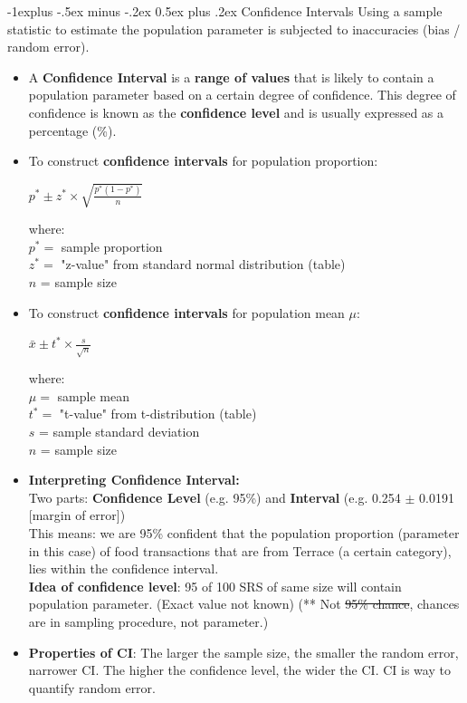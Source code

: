 \documentclass[10pt, landscape]{article}
\makeatletter
\renewcommand{\subsection}{\@startsection{subsection}{2}{0mm}%
                                {-1explus -.5ex minus -.2ex}%
                                {0.5ex plus .2ex}%
                                {\normalfont\normalsize\bfseries}}
\makeatother
\begin{document}
\begin{multicols*}{4}
\subsection{Confidence Intervals}
Using a sample statistic to estimate the population parameter is subjected to inaccuracies (bias / random error).
\begin{itemize}
	\item A \textbf{Confidence Interval} is a \textbf{range of values} that is likely to contain a population parameter based on a certain degree of confidence. This degree of confidence is known as the \textbf{confidence level} and is usually expressed as a percentage (\%). \\
	\item To construct \textbf{confidence intervals} for population proportion: \\
	\centerline{$p^* \pm z^* \times \sqrt{\frac{p^* (1-p^*)}{n}} $} 
	where: \\
	$p^* =$ sample proportion  \\
	$z^* =$ "z-value" from standard normal distribution (table)\\
	$n$ = sample size
	\item To construct \textbf{confidence intervals} for population mean $\mu$: \\
	\centerline{$ \bar{x} \pm t^* \times \frac{s}{\sqrt{n}} $} 
	where: \\
	$\mu =$ sample mean\\
	$t^* =$ "t-value" from t-distribution (table)\\
	$s$ = sample standard deviation \\
	$n$ = sample size

	\item \textbf{Interpreting Confidence Interval: } \\ Two parts: \textbf{Confidence Level} (e.g. 95\%) and \textbf{	Interval} (e.g. 0.254 $\pm$ 0.0191 [margin of error]) \\
	This means: we are 95\% confident that the population proportion (parameter in this case) of food transactions that are from Terrace (a certain category), lies within the confidence interval. \\
	\textbf{Idea of confidence level}: 95 of 100 SRS of same size will contain population parameter. (Exact value not known) (** Not \sout{95\% chance}, chances are in sampling procedure, not parameter.)
	\item \textbf{Properties of CI}: The larger the sample size, the smaller the random error, narrower CI. The higher the confidence level, the wider the CI. CI is way to quantify random error.


\end{itemize}
\end{multicols*}
\end{document}
